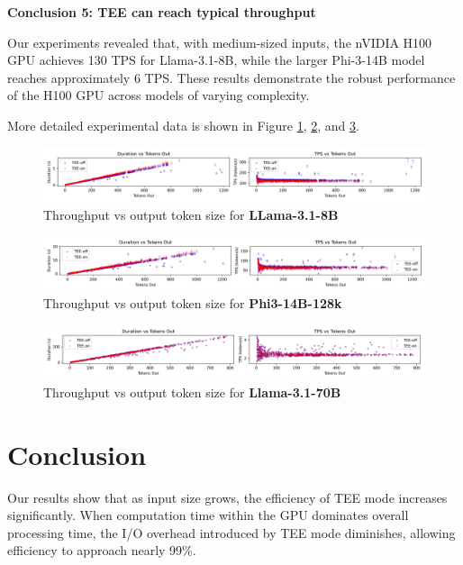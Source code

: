 \documentclass{article}
\begin{document}
\noindent\textbf{Conclusion 5: TEE can reach typical throughput}

Our experiments revealed that, with medium-sized inputs, the nVIDIA H100 GPU achieves 130 TPS for Llama-3.1-8B, while the larger Phi-3-14B model reaches approximately 6 TPS. These results demonstrate the robust performance of the H100 GPU across models of varying complexity.

More detailed experimental data is shown in Figure \ref{fig:scatter-llama8b}, \ref{fig:scatter-phi14b}, and \ref{fig:scatter-llama70b}.

\begin{figure}[ht]
    \centering
    \includegraphics[width=1\linewidth]{scatter-llama8b.png}
    \caption{Throughput vs output token size for \textbf{LLama-3.1-8B}}
    \label{fig:scatter-llama8b}
\end{figure}

\begin{figure}[ht]
    \centering
    \includegraphics[width=1\linewidth]{scatter-phi14b.png}
    \caption{Throughput vs output token size for \textbf{Phi3-14B-128k}}
    \label{fig:scatter-phi14b}
\end{figure}

\begin{figure}[ht]
    \centering
    \includegraphics[width=1\linewidth]{scatter-llama70b.png}
    \caption{Throughput vs output token size for \textbf{Llama-3.1-70B}}
    \label{fig:scatter-llama70b}
\end{figure}

\section{Conclusion}

Our results show that as input size grows, the efficiency of TEE mode increases significantly. When computation time within the GPU dominates overall processing time, the I/O overhead introduced by TEE mode diminishes, allowing efficiency to approach nearly 99\%.
\end{document}
